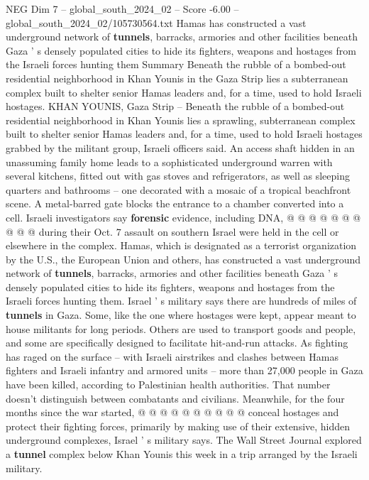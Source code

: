\begin{textsample}{NEG Dim 7 – global\_south\_2024\_02 – Score -6.00 – global\_south\_2024\_02/105730564.txt}  \label{ex:f7_neg_392}
Hamas has constructed a vast underground network of \textbf{tunnels}, barracks, armories and other facilities beneath Gaza ' s densely populated cities to hide its fighters, weapons and hostages from the Israeli forces hunting them Summary Beneath the rubble of a bombed-out residential neighborhood in Khan Younis in the Gaza Strip lies a subterranean complex built to shelter senior Hamas leaders and, for a time, used to hold Israeli hostages.
KHAN YOUNIS, Gaza Strip -- Beneath the rubble of a bombed-out residential neighborhood in Khan Younis lies a sprawling, subterranean complex built to shelter senior Hamas leaders and, for a time, used to hold Israeli hostages grabbed by the militant group, Israeli officers said.
An access shaft hidden in an unassuming family home leads to a sophisticated underground warren with several kitchens, fitted out with gas stoves and refrigerators, as well as sleeping quarters and bathrooms -- one decorated with a mosaic of a tropical beachfront scene.
A metal-barred gate blocks the entrance to a chamber converted into a cell.
Israeli investigators say \textbf{forensic} evidence, including DNA, @ @ @ @ @ @ @ @ @ @ during their Oct. 7 assault on southern Israel were held in the cell or elsewhere in the complex.
Hamas, which is designated as a terrorist organization by the U.S., the European Union and others, has constructed a vast underground network of \textbf{tunnels}, barracks, armories and other facilities beneath Gaza ' s densely populated cities to hide its fighters, weapons and hostages from the Israeli forces hunting them.
Israel ' s military says there are hundreds of miles of \textbf{tunnels} in Gaza.
Some, like the one where hostages were kept, appear meant to house militants for long periods.
Others are used to transport goods and people, and some are specifically designed to facilitate hit-and-run attacks.
As fighting has raged on the surface -- with Israeli airstrikes and clashes between Hamas fighters and Israeli infantry and armored units -- more than 27,000 people in Gaza have been killed, according to Palestinian health authorities.
That number doesn't distinguish between combatants and civilians.
Meanwhile, for the four months since the war started, @ @ @ @ @ @ @ @ @ @ conceal hostages and protect their fighting forces, primarily by making use of their extensive, hidden underground complexes, Israel ' s military says.
The Wall Street Journal explored a \textbf{tunnel} complex below Khan Younis this week in a trip arranged by the Israeli military.

\end{textsample}
